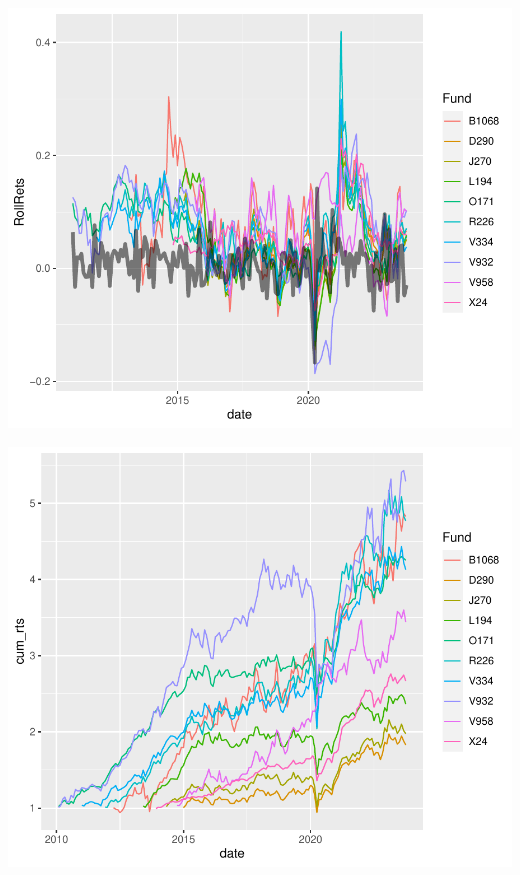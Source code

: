 \documentclass[12pt,preprint, authoryear]{elsarticle}
\numberwithin{equation}{section}
\numberwithin{figure}{section}
\numberwithin{table}{section}
\begin{document}
\includegraphics{Question-4_files/figure-latex/unnamed-chunk-4-1.pdf}

\includegraphics{Question-4_files/figure-latex/unnamed-chunk-5-1.pdf}
\end{document}
